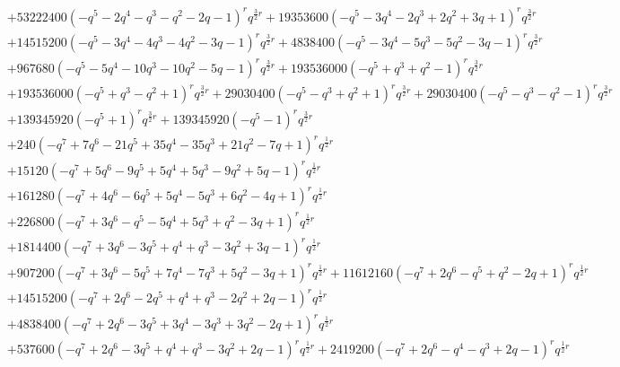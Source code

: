 \documentclass[11pt,english]{amsart}
\numberwithin{equation}{section}
\numberwithin{figure}{section}
\theoremstyle{plain}
\theoremstyle{plain}
\theoremstyle{definition}
\theoremstyle{remark}
\begin{document}
{\begin{align*}
& + 53222400  {\left(-q^{5} - 2  q^{4} - q^{3} - q^{2} - 2  q - 1\right)}^{r} q^{\frac{3}{2}  r} + 19353600  {\left(-q^{5} - 3  q^{4} - 2  q^{3} + 2  q^{2} + 3  q + 1\right)}^{r} q^{\frac{3}{2}  r} \\
& + 14515200  {\left(-q^{5} - 3  q^{4} - 4  q^{3} - 4  q^{2} - 3  q - 1\right)}^{r} q^{\frac{3}{2}  r} + 4838400  {\left(-q^{5} - 3  q^{4} - 5  q^{3} - 5  q^{2} - 3  q - 1\right)}^{r} q^{\frac{3}{2}  r} \\
& + 967680  {\left(-q^{5} - 5  q^{4} - 10  q^{3} - 10  q^{2} - 5  q - 1\right)}^{r} q^{\frac{3}{2}  r} + 193536000  {\left(-q^{5} + q^{3} + q^{2} - 1\right)}^{r} q^{\frac{3}{2}  r} \\
& + 193536000  {\left(-q^{5} + q^{3} - q^{2} + 1\right)}^{r} q^{\frac{3}{2}  r} + 29030400  {\left(-q^{5} - q^{3} + q^{2} + 1\right)}^{r} q^{\frac{3}{2}  r} + 29030400  {\left(-q^{5} - q^{3} - q^{2} - 1\right)}^{r} q^{\frac{3}{2}  r} \\
& + 139345920  {\left(-q^{5} + 1\right)}^{r} q^{\frac{3}{2}  r} + 139345920  {\left(-q^{5} - 1\right)}^{r} q^{\frac{3}{2}  r} \\
& + 240  {\left(-q^{7} + 7  q^{6} - 21  q^{5} + 35  q^{4} - 35  q^{3} + 21  q^{2} - 7  q + 1\right)}^{r} q^{\frac{1}{2}  r} \\
& + 15120  {\left(-q^{7} + 5  q^{6} - 9  q^{5} + 5  q^{4} + 5  q^{3} - 9  q^{2} + 5  q - 1\right)}^{r} q^{\frac{1}{2}  r} \\
& + 161280  {\left(-q^{7} + 4  q^{6} - 6  q^{5} + 5  q^{4} - 5  q^{3} + 6  q^{2} - 4  q + 1\right)}^{r} q^{\frac{1}{2}  r} \\
& + 226800  {\left(-q^{7} + 3  q^{6} - q^{5} - 5  q^{4} + 5  q^{3} + q^{2} - 3  q + 1\right)}^{r} q^{\frac{1}{2}  r} \\
& + 1814400  {\left(-q^{7} + 3  q^{6} - 3  q^{5} + q^{4} + q^{3} - 3  q^{2} + 3  q - 1\right)}^{r} q^{\frac{1}{2}  r} \\
& + 907200  {\left(-q^{7} + 3  q^{6} - 5  q^{5} + 7  q^{4} - 7  q^{3} + 5  q^{2} - 3  q + 1\right)}^{r} q^{\frac{1}{2}  r} + 11612160  {\left(-q^{7} + 2  q^{6} - q^{5} + q^{2} - 2  q + 1\right)}^{r} q^{\frac{1}{2}  r} \\
& + 14515200  {\left(-q^{7} + 2  q^{6} - 2  q^{5} + q^{4} + q^{3} - 2  q^{2} + 2  q - 1\right)}^{r} q^{\frac{1}{2}  r} \\
& + 4838400  {\left(-q^{7} + 2  q^{6} - 3  q^{5} + 3  q^{4} - 3  q^{3} + 3  q^{2} - 2  q + 1\right)}^{r} q^{\frac{1}{2}  r} \\
& + 537600  {\left(-q^{7} + 2  q^{6} - 3  q^{5} + q^{4} + q^{3} - 3  q^{2} + 2  q - 1\right)}^{r} q^{\frac{1}{2}  r} + 2419200  {\left(-q^{7} + 2  q^{6} - q^{4} - q^{3} + 2  q - 1\right)}^{r} q^{\frac{1}{2}  r} \\

\end{align*}}
\end{document}
